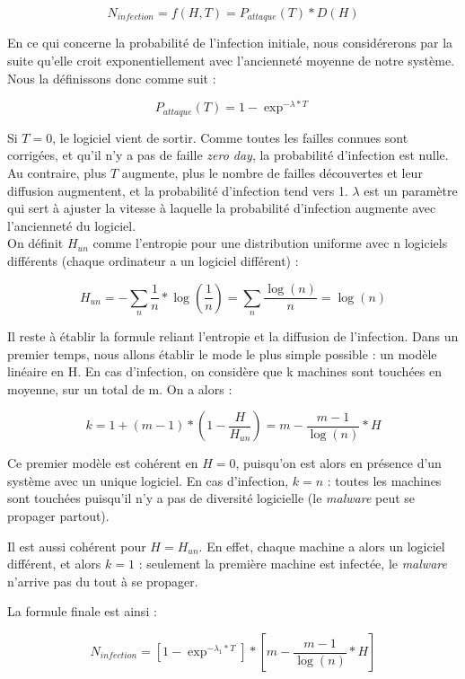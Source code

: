 \[
N_{infection} = f(H,T) = P_{attaque}(T)*D(H)
\]

En ce qui concerne la probabilité de l'infection initiale, nous considérerons par la suite qu'elle croit exponentiellement avec l'ancienneté moyenne de notre système. Nous la définissons donc comme suit :

\[
P_{attaque}(T) =1- \exp^{-\lambda*T}
\]

Si $T=0$, le logiciel vient de sortir. Comme toutes les failles connues sont corrigées, et qu'il n'y a pas de faille \textit{zero day}, la probabilité d'infection est nulle. Au contraire, plus $T$ augmente, plus le nombre de failles découvertes et leur diffusion augmentent, et la probabilité d'infection tend vers 1. $\lambda$ est un paramètre qui sert à ajuster la vitesse à laquelle la probabilité d'infection augmente avec l'ancienneté du logiciel.\\

On définit $H_{un}$ comme l'entropie pour une distribution uniforme avec n logiciels différents (chaque ordinateur a un logiciel différent) :

\[
H_{un} = -\sum_n \frac{1}{n} * \log(\frac{1}{n}) = \sum_n \frac{\log(n)}{n} = \log(n)
\]

Il reste à établir la formule reliant l'entropie et la diffusion de l'infection. Dans un premier temps, nous allons établir le mode le plus simple possible : un modèle linéaire en H. En cas d'infection, on considère que k machines sont touchées en moyenne, sur un total de m. On a alors :

\[
k=1+(m-1)*(1-\frac{H}{H_{un}}) =m-\frac{m-1}{\log(n)}*H
\]

Ce premier modèle est cohérent en $H=0$, puisqu'on est alors en présence d'un système avec un unique logiciel. En cas d'infection, $k=n$ : toutes les machines sont touchées puisqu'il n'y a pas de diversité logicielle (le \textit{malware} peut se propager partout).

Il est aussi cohérent pour $H=H_{un}$. En effet, chaque machine a alors un logiciel différent, et alors $k=1$ : seulement la première machine est infectée, le \textit{malware} n'arrive pas du tout à se propager.

La formule finale est ainsi :


\[
N_{infection}=[1-\exp^{-\lambda_1*T}] * [m-\frac{m-1}{\log(n)}*H]
\]

